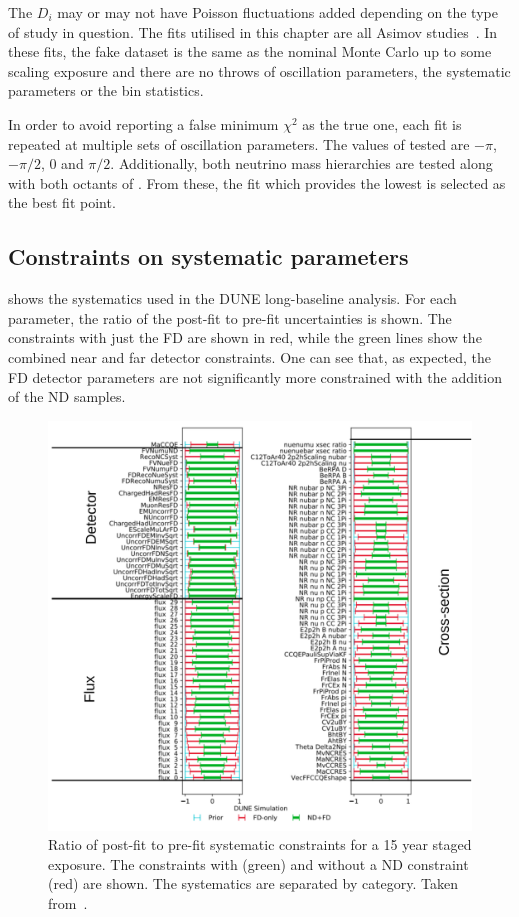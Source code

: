 The $D_{i}$ may or may not have Poisson fluctuations added depending on the type of study in question.
The fits utilised in this chapter are all Asimov studies~\cite{asimov}.
In these fits, the fake dataset is the same as the nominal Monte Carlo up to some scaling exposure and there are no throws of oscillation parameters, the systematic parameters or the bin statistics.

In order to avoid reporting a false minimum $\chi^{2}$ as the true one, each fit is repeated at multiple sets of oscillation parameters. 
The values of \dcp tested are $-\pi$, $-\pi/2$, 0 and $\pi/2$. 
Additionally, both neutrino mass hierarchies are tested along with both octants of .
From these, the fit which provides the lowest \chisquare is selected as the best fit point.

\subsection{Constraints on systematic parameters}

 shows the systematics used in the DUNE long-baseline analysis.
For each parameter, the ratio of the post-fit to pre-fit uncertainties is shown.
The constraints with just the FD are shown in red, while the green lines show the combined near and far detector constraints.
One can see that, as expected, the FD detector parameters are not significantly more constrained with the addition of the ND samples. 

\begin{figure}[h]
	\centering
	\includegraphics[width=.8\linewidth]{files/figures/dune_lbl/constraintsWithLines}
	\caption[DUNE systematic constraints with and without a near detector constraint]{Ratio of post-fit to pre-fit systematic constraints for a 15 year staged exposure. The constraints with (green) and without a ND constraint (red) are shown. The systematics are separated by category. Taken from~\cite{Abi:2020qib}.}
	\label{fig:systConstraints}
\end{figure}

